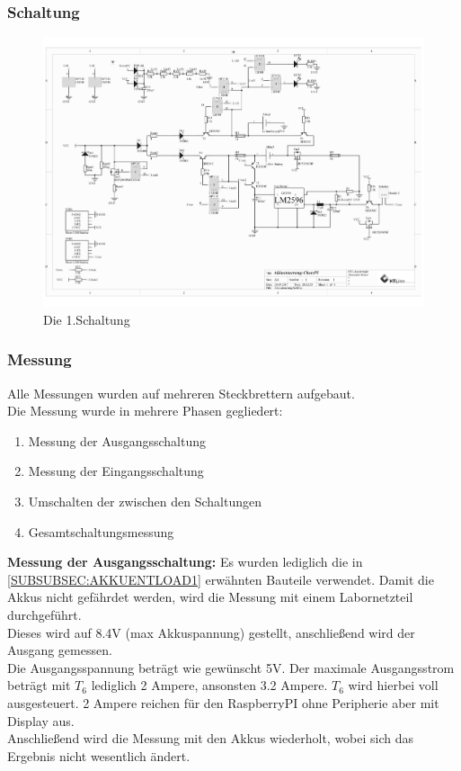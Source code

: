 \documentclass[12pt,a4paper]{article}
\begin{document}
{\subsubsection{Schaltung}
\label{SUBSUBSEC:CIRCUIT-1}
\begin{figure}[H]
  \centering
		\includegraphics[scale=0.7, angle=90]{graphics/20170920-Shematic.pdf}
		\caption{Die 1.Schaltung}
		\label{fig:circuit1}
\end{figure}

\newpage
\subsubsection{Messung}
\label{SUBSUBSEC:MEASUREMENT1}

Alle Messungen wurden auf mehreren Steckbrettern aufgebaut. \\
Die Messung wurde in mehrere Phasen gegliedert:
\begin{enumerate}
	\item{Messung der Ausgangsschaltung}
	\item{Messung der Eingangsschaltung}
	\item{Umschalten der zwischen den Schaltungen}
	\item{Gesamtschaltungsmessung}
\end{enumerate}

\textbf{Messung der Ausgangsschaltung:}  Es wurden lediglich die in \ref{SUBSUBSEC:AKKUENTLOAD1} erwähnten Bauteile verwendet. Damit die Akkus nicht gefährdet werden, wird die Messung mit einem Labornetzteil durchgeführt. \\
Dieses wird auf 8.4V (max Akkuspannung) gestellt, anschließend wird der Ausgang gemessen. \\
Die Ausgangsspannung beträgt wie gewünscht 5V.
Der maximale Ausgangsstrom beträgt mit $T_6$ lediglich 2 Ampere, ansonsten 3.2 Ampere. $T_6$ wird hierbei voll ausgesteuert. 2 Ampere reichen für den RaspberryPI ohne Peripherie aber mit Display aus. \\
Anschließend wird die Messung mit den Akkus wiederholt, wobei sich das Ergebnis nicht wesentlich ändert.\\[2ex]

}
\end{document}
